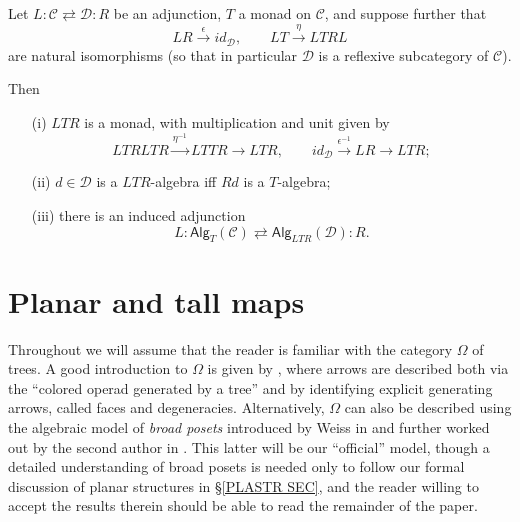 \documentclass[a4paper,10pt]{article}%
\begin{document}
\begin{proposition}\label{MONADADJ PROP}
Let
$
L \colon \mathcal{C} \rightleftarrows \mathcal{D} \colon R
$
be an adjunction, $T$ a monad on $\mathcal{C}$, and suppose further that
\[
	LR \xrightarrow{\epsilon} id_{\mathcal{D}}, 
\qquad
	LT \xrightarrow{\eta} LTRL
\]
are natural isomorphisms 
(so that in particular $\mathcal{D}$ is a reflexive subcategory of $\mathcal{C}$).

Then
\begin{itemize}
\item[(i)] $LTR$ is a monad, with multiplication and unit given by
\[LTRLTR \xrightarrow{\eta^{-1}} LTTR \to LTR,\qquad
id_{\mathcal{D}} \xrightarrow{\epsilon^{-1}} LR \to LTR;
\]
\item[(ii)]
$d \in \mathcal{D}$ is a $LTR$-algebra iff $Rd$ is a $T$-algebra;
\item[(iii)] there is an induced adjunction
\[
L \colon \mathsf{Alg}_{T}(\mathcal{C})
	\rightleftarrows
\mathsf{Alg}_{LTR}(\mathcal{D}) \colon R.
\]
\end{itemize}
\end{proposition}


\section{Planar and tall maps}\label{PLANAR_SECTION}


Throughout we will assume that the reader is familiar with the category $\Omega$ of trees.
A good introduction to $\Omega$ is given by 
\cite[\S 3]{MW07}, where arrows are described both via 
the ``colored operad generated by a tree''  and by identifying explicit generating arrows, called faces and degeneracies.
Alternatively, $\Omega$ can also be described 
using the algebraic model of 
\textit{broad posets}
introduced by Weiss in \cite{We12} and further worked out by the second author in \cite[\S 5]{Pe17}.
This latter will be our ``official'' model,
though a detailed understanding of broad posets is needed only
to follow our formal discussion of planar structures in \S \ref{PLASTR SEC},
and the reader willing to accept the results therein should be able to read the remainder of the paper.
\end{document}
